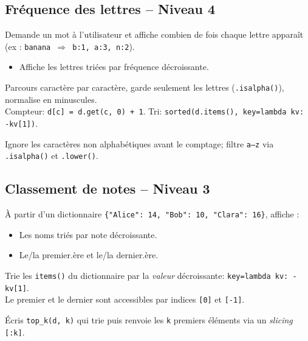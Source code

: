 \documentclass[11pt,a4paper]{article}
\begin{document}
\subsection*{Fréquence des lettres -- Niveau 4}
Demande un mot à l'utilisateur et affiche combien de fois chaque lettre apparaît (ex : \texttt{banana $\Rightarrow$ b:1, a:3, n:2}).
\begin{itemize}
    \item Affiche les lettres triées par fréquence décroissante.
\end{itemize}
\begin{tcolorbox}[title=Aide]
Parcours caractère par caractère, garde seulement les lettres (\texttt{.isalpha()}), normalise en minuscules.\\
Compteur: \texttt{d[c] = d.get(c, 0) + 1}. Tri: \texttt{sorted(d.items(), key=lambda kv: -kv[1])}.
\end{tcolorbox}
\begin{tcolorbox}[title=Bonus -- Aide]
Ignore les caractères non alphabétiques avant le comptage; filtre \texttt{a--z} via \texttt{.isalpha()} et \texttt{.lower()}.
\end{tcolorbox}

\subsection*{Classement de notes -- Niveau 3}
À partir d'un dictionnaire \texttt{\{"Alice": 14, "Bob": 10, "Clara": 16\}}, affiche :
\begin{itemize}
    \item Les noms triés par note décroissante.
    \item Le/la premier.ère et le/la dernier.ère.
\end{itemize}
\begin{tcolorbox}[title=Aide]
Trie les \texttt{items()} du dictionnaire par la \emph{valeur} décroissante: \texttt{key=lambda kv: -kv[1]}.\\
Le premier et le dernier sont accessibles par indices \texttt{[0]} et \texttt{[-1]}.
\end{tcolorbox}
\begin{tcolorbox}[title=Bonus -- Aide]
Écris \texttt{top\_k(d, k)} qui trie puis renvoie les \texttt{k} premiers éléments via un \emph{slicing} \texttt{[:k]}.
\end{tcolorbox}

\end{document}
